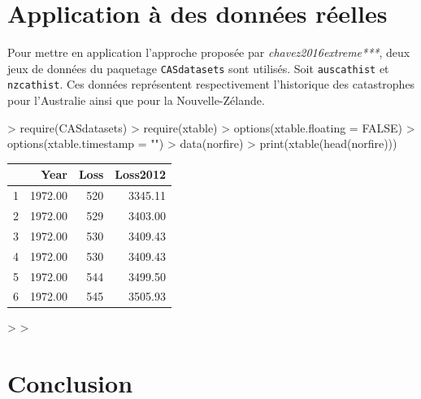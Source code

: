 \documentclass[11pt]{report}
\numberwithin{equation}{section}
\begin{document}
\chapter{Application à des données réelles}
\label{chap:application} 

Pour mettre en application l'approche proposée par \textit{chavez2016extreme***}, deux jeux de données du paquetage \texttt{CASdatasets} sont utilisés. Soit \texttt{auscathist} et \texttt{nzcathist}. Ces données représentent respectivement l'historique des catastrophes pour l'Australie ainsi que pour la Nouvelle-Zélande.


\begin{Schunk}
\begin{Sinput}
> require(CASdatasets)
> require(xtable)
> options(xtable.floating = FALSE)
> options(xtable.timestamp = "")
> data(norfire)
> print(xtable(head(norfire)))
\end{Sinput}
% 
\begin{tabular}{rrrr}
  \hline
 & Year & Loss & Loss2012 \\ 
  \hline
1 & 1972.00 & 520 & 3345.11 \\ 
  2 & 1972.00 & 529 & 3403.00 \\ 
  3 & 1972.00 & 530 & 3409.43 \\ 
  4 & 1972.00 & 530 & 3409.43 \\ 
  5 & 1972.00 & 544 & 3499.50 \\ 
  6 & 1972.00 & 545 & 3505.93 \\ 
   \hline
\end{tabular}\begin{Sinput}
> 
> 
\end{Sinput}
\end{Schunk}

\chapter*{Conclusion}
\label{chap:conclusion} 




% 
\end{document}
